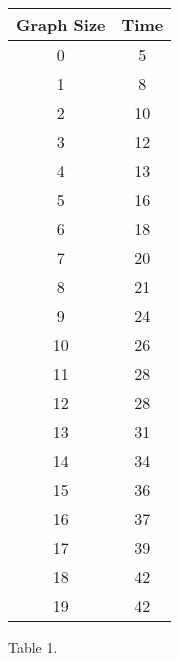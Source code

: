 {\bfseries\itshape\color{carmine}{Observation:}} {\itshape{}} \hfill \break

\begin{center}
\begin{tabular}{c c}
\toprule \toprule
\hspace{100px} Graph Size \hspace{90px} & \hspace{100px} Time \hspace{90px} \\
\midrule \midrule
0 & 5 \\
\midrule
1 & 8 \\
\midrule
2 & 10 \\
\midrule
3 & 12 \\
\midrule
4 & 13 \\
\midrule
5 & 16 \\
\midrule
6 & 18 \\
\midrule
7 & 20 \\
\midrule
8 & 21 \\
\midrule
9 & 24 \\
\midrule
10 & 26 \\
\midrule
11 & 28 \\
\midrule
12 & 28 \\
\midrule
13 & 31 \\
\midrule
14 & 34 \\
\midrule
15 & 36 \\
\midrule
16 & 37 \\
\midrule
17 & 39 \\
\midrule
18 & 42 \\
\midrule
19 & 42 \\
\bottomrule
\end{tabular}
\centering \linebreak \linebreak Table 1.
\end{center}

